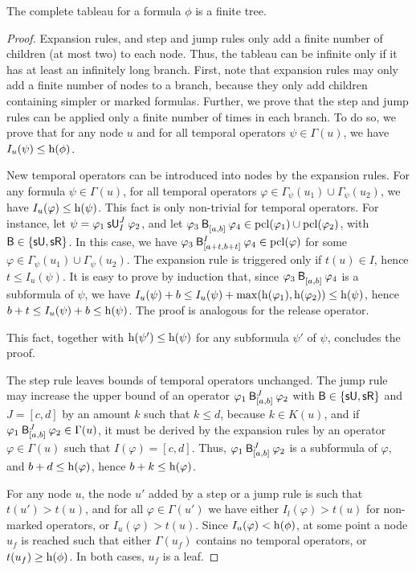 \documentclass[acmsmall,screen]{acmart}
\begin{document}
\begin{theorem}[Termination]
The complete tableau for a formula $\phi$ is a finite tree.
\end{theorem}
\begin{proof}
Expansion rules, and step and jump rules only add a finite number of children (at most two) to each node.
Thus, the tableau can be infinite only if it has at least an infinitely long branch.
First, note that expansion rules may only add a finite number of nodes to a branch,
because they only add children containing simpler or marked formulas.
Further, we prove that the step and jump rules can be applied only a finite number of times in each branch.
%
To do so, we prove that for any node $u$ and for all temporal operators $\psi \in \Gamma(u)$,
we have $I_u(\psi) \leq \horiz(\phi)$.

New temporal operators can be introduced into nodes by the expansion rules.
For any formula $\psi \in \Gamma(u)$, for all temporal operators
$\varphi \in \Gamma_\psi(u_1) \cup \Gamma_\psi(u_2)$,
we have $I_u(\varphi) \leq \horiz(\psi)$.
This fact is only non-trivial for temporal operators.
For instance, let $\psi = \suntil[J]{I}{\varphi_1}{\varphi_2}$,
and let $\anybinop{[a,b]}{\varphi_3}{\varphi_4} \in \pcl(\varphi_1) \cup \pcl(\varphi_2)$,
with $\mathsf{B} \in \set{\suntilop, \sreleaseop}$.
In this case, we have $\anybinop[I]{[a+t,b+t]}{\varphi_3}{\varphi_4} \in \pcl(\varphi)$
for some $\varphi \in \Gamma_\psi(u_1) \cup \Gamma_\psi(u_2)$.
The expansion rule is triggered only if $t(u) \in I$, hence $t \leq I_u(\psi)$.
It is easy to prove by induction that, since $\anybinop{[a,b]}{\varphi_3}{\varphi_4}$ is a subformula of $\psi$,
we have $I_u(\psi) + b \leq I_u(\psi) + \max(\horiz(\varphi_1), \horiz(\varphi_2)) \leq \horiz(\psi) $,
hence $b+t \leq I_u(\psi) + b \leq \horiz(\psi)$.
The proof is analogous for the release operator.

This fact, together with $\horiz(\psi') \leq \horiz(\psi)$ for any subformula $\psi'$ of $\psi$,
concludes the proof.

The step rule leaves bounds of temporal operators unchanged.
The jump rule may increase the upper bound of an operator
$\anybinop[J]{[a,b]}{\varphi_1}{\varphi_2}$ with $\mathsf{B} \in \set{\suntilop, \sreleaseop}$
and $J = [c,d]$ by an amount $k$ such that $k \leq d$, because $k \in K(u)$,
and if $\anybinop[J]{[a,b]}{\varphi_1}{\varphi_2} \in \Gamma(u)$,
it must be derived by the expansion rules by an operator $\varphi \in \Gamma(u)$
such that $I(\varphi) = [c,d]$.
Thus, $\anybinop[J]{[a,b]}{\varphi_1}{\varphi_2}$ is a subformula of $\varphi$,
and $b + d \leq \horiz(\varphi)$, hence $b + k \leq \horiz(\varphi)$.

For any node $u$, the node $u'$ added by a step or a jump rule is such that $t(u') > t(u)$,
and for all $\varphi \in \Gamma(u')$ we have either $I_l(\varphi) > t(u)$ for non-marked operators,
or $I_u(\varphi) > t(u)$.
Since $I_u(\varphi) < \horiz(\phi)$, at some point a node $u_f$ is reached such that
either $\Gamma(u_f)$ contains no temporal operators, or $t(u_f) \geq \horiz(\phi)$.
In both cases, $u_f$ is a leaf.
\end{proof}
\end{document}
